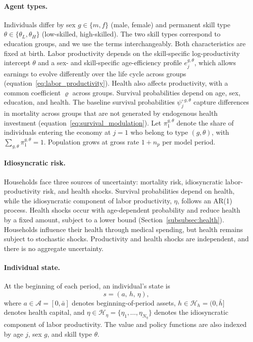 \documentclass[12pt,a4paper]{article}
\begin{document}
\paragraph{Agent types.}
Individuals differ by sex $g \in \{m, f\}$ (male, female) and permanent skill type $\theta \in \{\theta_L, \theta_H\}$ (low-skilled, high-skilled). The two skill types correspond to education groups, and we use the terms interchangeably. Both characteristics are fixed at birth. Labor productivity depends on the skill-specific log-productivity intercept $\theta$ and a sex- and skill-specific age-efficiency profile $e_j^{g,\theta}$, which allows earnings to evolve differently over the life cycle across groups (equation~\eqref{eq:labor_productivity}). Health also affects productivity, with a common coefficient $\varrho$ across groups. Survival probabilities depend on age, sex, education, and health. The baseline survival probabilities $\psi^{\circ\,g,\theta}_j$ capture differences in mortality across groups that are not generated by endogenous health investment (equation~\eqref{eq:survival_modulation}). Let $\pi^{g,\theta}_1$ denote the share of individuals entering the economy at $j=1$ who belong to type $(g,\theta)$, with $\sum_{g,\theta}\pi^{g,\theta}_1=1$. Population grows at gross rate $1+n_p$ per model period.


\paragraph{Idiosyncratic risk.}
Households face three sources of uncertainty: mortality risk, idiosyncratic labor-productivity risk, and health shocks. Survival probabilities depend on health, while the idiosyncratic component of labor productivity, $\eta$, follows an AR(1) process. Health shocks occur with age-dependent probability and reduce health by a fixed amount, subject to a lower bound (Section~\ref{subsubsec:health}). Households influence their health through medical spending, but health remains subject to stochastic shocks. Productivity and health shocks are independent, and there is no aggregate uncertainty.


\paragraph{Individual state.}
At the beginning of each period, an individual's state is
\begin{equation}
\label{eq:state}
s = (a,\, h,\, \eta),
\end{equation}
where $a \in \mathcal{A} = [0, \bar{a}]$ denotes beginning-of-period assets, $h \in \mathcal{H}_h = (0, \bar{h}]$ denotes health capital, and $\eta \in \mathcal{H}_\eta = \{\eta_1, \ldots, \eta_{N_\eta}\}$ denotes the idiosyncratic component of labor productivity. The value and policy functions are also indexed by age $j$, sex $g$, and skill type $\theta$.
\end{document}
